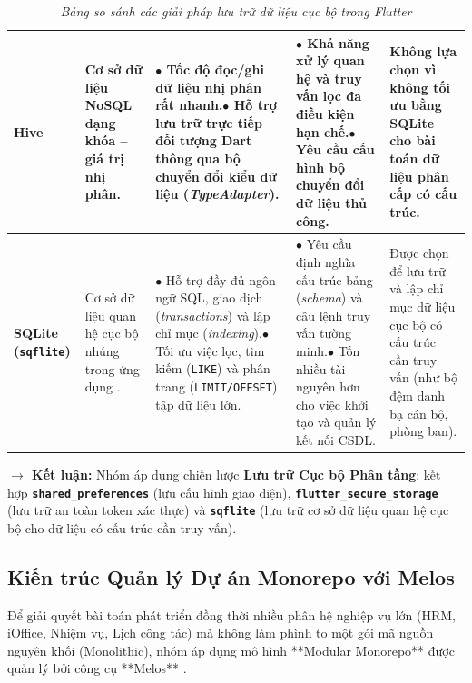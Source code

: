 \begin{table}[H]
\begin{tabularx}{\textwidth}{|L{2.3cm}|L{2.3cm}|Y|Y|L{2.8cm}|}
    \hline
    \textbf{Hive} & Cơ sở dữ liệu NoSQL dạng khóa -- giá trị nhị phân. & $\bullet$ Tốc độ đọc/ghi dữ liệu nhị phân rất nhanh.\newline $\bullet$ Hỗ trợ lưu trữ trực tiếp đối tượng Dart thông qua bộ chuyển đổi kiểu dữ liệu (\textit{TypeAdapter}). & $\bullet$ Khả năng xử lý quan hệ và truy vấn lọc đa điều kiện hạn chế.\newline $\bullet$ Yêu cầu cấu hình bộ chuyển đổi dữ liệu thủ công. & Không lựa chọn vì không tối ưu bằng SQLite cho bài toán dữ liệu phân cấp có cấu trúc. \\
    \hline
    \textbf{SQLite (\texttt{sqflite})} & Cơ sở dữ liệu quan hệ cục bộ nhúng trong ứng dụng \cite{sqflite_doc}. & $\bullet$ Hỗ trợ đầy đủ ngôn ngữ SQL, giao dịch (\textit{transactions}) và lập chỉ mục (\textit{indexing}).\newline $\bullet$ Tối ưu việc lọc, tìm kiếm (\texttt{LIKE}) và phân trang (\texttt{LIMIT/OFFSET}) tập dữ liệu lớn. & $\bullet$ Yêu cầu định nghĩa cấu trúc bảng (\textit{schema}) và câu lệnh truy vấn tường minh.\newline $\bullet$ Tốn nhiều tài nguyên hơn cho việc khởi tạo và quản lý kết nối CSDL. & Được chọn để lưu trữ và lập chỉ mục dữ liệu cục bộ có cấu trúc cần truy vấn (như bộ đệm danh bạ cán bộ, phòng ban). \\
    \hline
    \end{tabularx}
    \caption{\textit{Bảng so sánh các giải pháp lưu trữ dữ liệu cục bộ trong Flutter}}
    \label{tab:compare_local_storage}
\end{table}

\noindent \textbf{$\rightarrow$ Kết luận:} Nhóm áp dụng chiến lược \textbf{Lưu trữ Cục bộ Phân tầng}: kết hợp \textbf{\texttt{shared\_preferences}} (lưu cấu hình giao diện), \textbf{\texttt{flutter\_\allowbreak secure\_\allowbreak storage}} (lưu trữ an toàn token xác thực) và \textbf{\texttt{sqflite}} (lưu trữ cơ sở dữ liệu quan hệ cục bộ cho dữ liệu có cấu trúc cần truy vấn).

\subsection{Kiến trúc Quản lý Dự án Monorepo với Melos}
\label{subsec:melos_monorepo}

Để giải quyết bài toán phát triển đồng thời nhiều phân hệ nghiệp vụ lớn (HRM, iOffice, Nhiệm vụ, Lịch công tác) mà không làm phình to một gói mã nguồn nguyên khối (Monolithic), nhóm áp dụng mô hình **Modular Monorepo** được quản lý bởi công cụ **Melos** \cite{melos_doc}.

